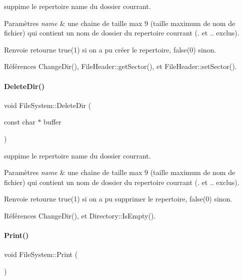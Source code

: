 suppime le repertoire name du dossier courrant. 


\begin{DoxyParams}{Paramètres}
{\em name} & une chaine de taille max 9 (taille maximum de nom de fichier) qui contient un nom de dossier du repertoire courrant (. et .. exclus). \\
\hline
\end{DoxyParams}
\begin{DoxyReturn}{Renvoie}
retourne true(1) si on a pu créer le repertoire, false(0) sinon. 
\end{DoxyReturn}


Références Change\+Dir(), File\+Header\+::get\+Sector(), et File\+Header\+::set\+Sector().

\hypertarget{class_file_system_a1895af5b9242017d18dd7bfd349eeee4}{}\label{class_file_system_a1895af5b9242017d18dd7bfd349eeee4} 
\paragraph{\texorpdfstring{Delete\+Dir()}{DeleteDir()}}
{\footnotesize\ttfamily void File\+System\+::\+Delete\+Dir (\begin{DoxyParamCaption}\item[{const char $\ast$}]{buffer }\end{DoxyParamCaption})}



suppime le repertoire name du dossier courrant. 


\begin{DoxyParams}{Paramètres}
{\em name} & une chaine de taille max 9 (taille maximum de nom de fichier) qui contient un nom de dossier du repertoire courrant (. et .. exclus). \\
\hline
\end{DoxyParams}
\begin{DoxyReturn}{Renvoie}
retourne true(1) si on a pu supprimer le repertoire, false(0) sinon. 
\end{DoxyReturn}


Références Change\+Dir(), et Directory\+::\+Is\+Empty().

\hypertarget{class_file_system_aebaf06661b1879a62afefa5abe99f21e}{}\label{class_file_system_aebaf06661b1879a62afefa5abe99f21e} 
\paragraph{\texorpdfstring{Print()}{Print()}}
{\footnotesize\ttfamily void File\+System\+::\+Print (\begin{DoxyParamCaption}{ }\end{DoxyParamCaption})}




